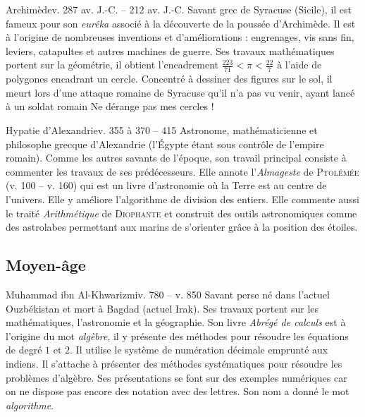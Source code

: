 \documentclass[10pt,class=article,crop=false]{standalone}
\begin{document}
\begin{multicols}{2}
\begin{biographie}{Archimède}{v. 287 av. J.-C. -- 212 av. J.-C.}
Savant grec de Syracuse (Sicile), il est fameux pour son \emph{eurêka} associé à la découverte de la poussée d'Archimède. Il est à l'origine de nombreuses inventions et d'améliorations : engrenages, vis sans fin, leviers, catapultes et autres machines de guerre.
Ses travaux mathématiques portent sur la géométrie, il obtient l'encadrement $\frac{223}{71} < \pi < \frac{22}{7}$ à l'aide de polygones encadrant un cercle.
Concentré à dessiner des figures sur le sol, il meurt lors d'une attaque romaine de Syracuse qu'il n'a pas vu venir, ayant lancé à un soldat romain \og{}Ne dérange pas mes cercles !\fg{}
\end{biographie}


\begin{biographie}{Hypatie d'Alexandrie}{v. 355 à 370 -- 415}
Astronome, mathématicienne et philosophe grecque d'Alexandrie (l'Égypte étant sous contrôle de l'empire romain). Comme les autres savants de l'époque, son travail principal consiste à commenter les travaux de ses prédécesseurs. Elle annote l'\emph{Almageste} de \textsc{Ptolémée} (v. 100 -- v. 160) qui est un livre d'astronomie où la Terre est au centre de l'univers. Elle y améliore l'algorithme de division des entiers. Elle commente aussi le traité \emph{Arithmétique} de \textsc{Diophante} et construit des outils astronomiques comme des astrolabes permettant aux marins de s'orienter grâce à la position des étoiles.
\end{biographie}


\subsection{Moyen-âge}

\begin{biographie}{Muhammad ibn Al-Khwarizmi}{v. 780 -- v. 850}
Savant perse né dans l'actuel Ouzbékistan et mort à Bagdad (actuel Irak).	Ses travaux portent sur les mathématiques, l'astronomie et la géographie.
Son livre \emph{Abrégé de calculs} est à l'origine du mot \emph{algèbre}, il y présente des méthodes  pour résoudre les équations de degré $1$ et $2$. Il utilise le système de numération décimale emprunté aux indiens. Il s'attache à présenter des méthodes systématiques pour résoudre les problèmes d'algèbre. 
Ses présentations se font sur des exemples numériques car on ne dispose pas encore des notation avec des lettres. Son nom a donné le mot \emph{algorithme}.
\end{biographie}



\end{multicols}
\end{document}
